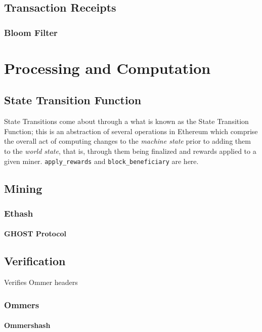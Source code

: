 \documentclass[10pt,a4paper,leqno,bibliography=totoc]{scrartcl}
\newenvironment{alphafootnotes}
{\par\edef\savedfootnotenumber{\number\value{footnote}}
\renewcommand{\thefootnote}{\alph{footnote}}
\setcounter{footnote}{0}}
{\par\setcounter{footnote}{\savedfootnotenumber}}
\begin{document}
\begin{alphafootnotes}
\begin{multicols*}{2}
		\subsection{Transaction Receipts}

   			 \subsubsection{Bloom Filter}
\clearpage

	\section{Processing and Computation}
	
		\subsection{State Transition Function}
		State Transitions come about through a what is known as the State Transition Function; this is an abstraction of several operations in Ethereum which comprise the overall act of computing changes to the \textit{machine state} prior to adding them to the \textit{world state}, that is, through them being finalized and rewards applied to a given miner. \texttt{apply\_rewards} and \texttt{block\_beneficiary} are here.

    		\subsection{Mining}

			\subsubsection{Ethash}
	
			\paragraph{GHOST Protocol}

		\subsection{Verification}
		    Verifies Ommer headers

			\subsubsection{Ommers}
				\paragraph{Ommershash}


\end{multicols*}
\end{alphafootnotes}
\end{document}
